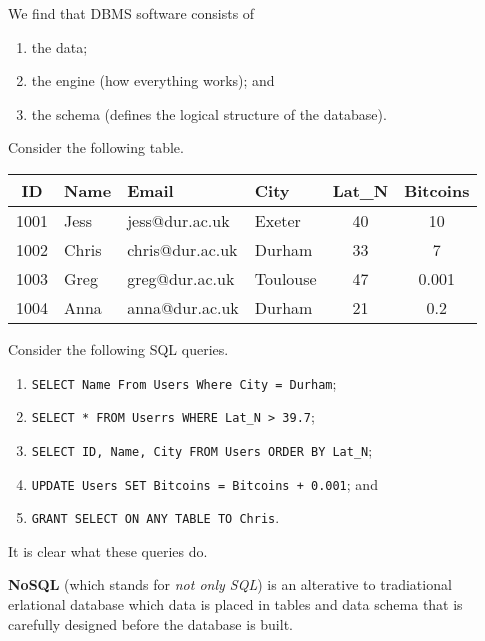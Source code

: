 We find that DBMS software consists of
\begin{enumerate}
    \item the data;
    \item the engine (how everything works); and
    \item the schema (defines the logical structure of the database).
\end{enumerate}

\begin{example}
    Consider the following table.
    \begin{center}
        \begin{tabular}{clllcc}
            \toprule
            ID & Name & Email & City & Lat\_N & Bitcoins \\
            \midrule
            1001 & Jess & jess@dur.ac.uk & Exeter & 40 & 10 \\
            1002 & Chris & chris@dur.ac.uk & Durham & 33 & 7 \\
            1003 & Greg & greg@dur.ac.uk & Toulouse & 47 & 0.001 \\
            1004 & Anna & anna@dur.ac.uk & Durham & 21 & 0.2 \\
            \bottomrule
        \end{tabular}
    \end{center}
    Consider the following SQL queries.
    \begin{enumerate}
        \item \texttt{SELECT Name From Users Where City = Durham};
        \item \texttt{SELECT * FROM Userrs WHERE Lat\_N > 39.7};
        \item \texttt{SELECT ID, Name, City FROM Users ORDER BY Lat\_N};
        \item \texttt{UPDATE Users SET Bitcoins = Bitcoins + 0.001}; and
        \item \texttt{GRANT SELECT ON ANY TABLE TO Chris}.
    \end{enumerate}
    It is clear what these queries do.
\end{example}

\begin{definition}[NoSQL]
    \textbf{NoSQL} (which stands for \emph{not only SQL}) is an alterative to tradiational erlational database which data is placed in tables and data schema that is carefully designed before the database is built. 
\end{definition}

